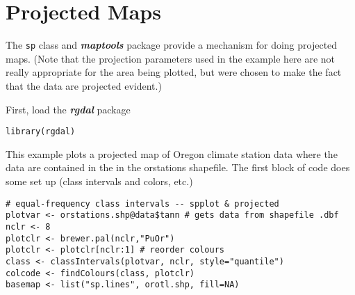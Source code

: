 \documentclass[12pt]{article}
\begin{document}

\newpage
\section{Projected Maps}
%
The \texttt{sp} class and \textit{\textbf{maptools}} package provide a mechanism for doing projected maps.  (Note that the projection parameters used in the example here are not really appropriate for the area being plotted, but were chosen to make the fact that the data are projected evident.)

First, load the \textit{\textbf{rgdal}} package
\begin{verbatim}
library(rgdal)
\end{verbatim}
This example plots a projected map of Oregon climate station data where the data are contained in the  in the orstations shapefile.  The first block of code does some set up (class intervals and colors, etc.)
\begin{framed}
\begin{verbatim}
# equal-frequency class intervals -- spplot & projected
plotvar <- orstations.shp@data$tann # gets data from shapefile .dbf
nclr <- 8
plotclr <- brewer.pal(nclr,"PuOr")
plotclr <- plotclr[nclr:1] # reorder colours
class <- classIntervals(plotvar, nclr, style="quantile")
colcode <- findColours(class, plotclr)
basemap <- list("sp.lines", orotl.shp, fill=NA)
\end{verbatim}
\end{framed}
\end{document}
